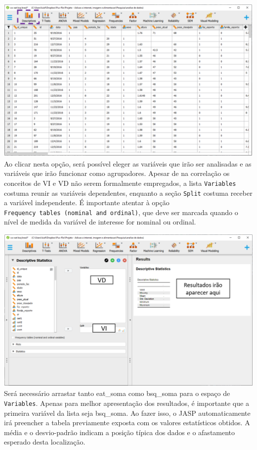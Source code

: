 \documentclass[
]{book}
\begin{document}
\includegraphics{./img/cap_correlacao_descritivo.png}
Ao clicar nesta opção, será possível eleger as variáveis que irão ser analisadas e as variáveis que irão funcionar como agrupadores. Apesar de na correlação os conceitos de VI e VD não serem formalmente empregados, a lista \texttt{Variables} costuma reunir as variáveis dependentes, enquanto a seção \texttt{Split} costuma receber a variável independente. É importante atentar à opção \texttt{Frequency\ tables\ (nominal\ and\ ordinal)}, que deve ser marcada quando o nível de medida da variável de interesse for nominal ou ordinal.

\includegraphics{./img/cap_correlacao_descritivo2.png}
Será necessário arrastar tanto eat\_soma como bsq\_soma para o espaço de \texttt{Variables}. Apenas para melhor apresentação dos resultados, é importante que a primeira variável da lista seja bsq\_soma. Ao fazer isso, o JASP automaticamente irá preencher a tabela previamente exposta com os valores estatísticos obtidos. A média e o desvio-padrão indicam a posição típica dos dados e o afastamento esperado desta localização.
\end{document}
